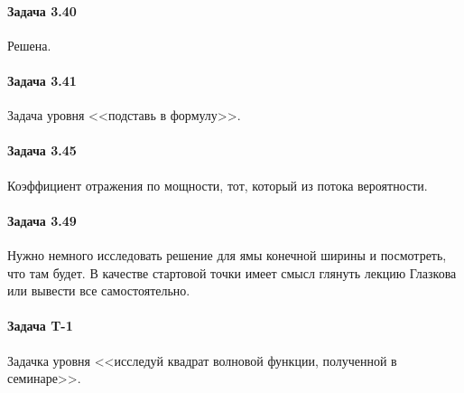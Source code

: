 \documentclass[12pt]{article}
\begin{document}
\paragraph{Задача 3.40} Решена.

\paragraph{Задача 3.41} Задача уровня <<подставь в формулу>>.

\paragraph{Задача 3.45} Коэффициент отражения по мощности, тот, который из потока вероятности.

\paragraph{Задача 3.49} Нужно немного исследовать решение для ямы конечной ширины и посмотреть, что там будет. В качестве стартовой точки имеет смысл глянуть лекцию Глазкова или вывести все самостоятельно.

\paragraph{Задача T-1} Задачка уровня <<исследуй квадрат волновой функции, полученной в семинаре>>.
\end{document}
